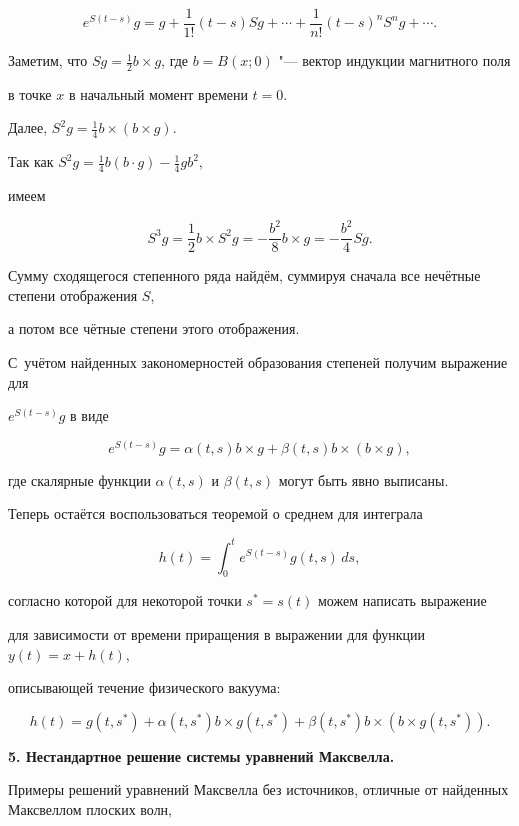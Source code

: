$$

e^{S(t-s)}g = g + \frac{1}{1!}(t-s)Sg + \cdots + \frac{1}{n!}(t-s)^nS^ng + \cdots.

$$ 

Заметим, что $Sg = \frac{1}{2}b\times g$, где $b = B(x;0)$ "--- вектор индукции магнитного поля 

в точке $x$ в начальный момент времени $t = 0$. 



Далее, $S^2g = \frac{1}{4}b\times(b\times g)$. 

Так как $S^2g = \frac{1}{4}b(b\cdot g) - \frac{1}{4}gb^2 $, 

имеем

$$

S^3g = \frac{1}{2}b\times S^2g = -\frac{b^2}{8}b\times g = -\frac{b^2}{4}Sg. 

$$

Сумму сходящегося степенного ряда найдём, суммируя сначала все нечётные степени отображения $S$, 

а потом все чётные степени этого отображения. 

С~учётом найденных закономерностей образования степеней получим выражение для 

$e^{S(t-s)}g$ в виде 

$$e^{S(t-s)}g = \alpha(t,s)b\times g + \beta(t,s)b\times(b\times g),$$ 

где скалярные функции $\alpha(t,s)$ и $\beta(t,s)$ могут быть явно выписаны. 



Теперь остаётся воспользоваться теоремой о среднем для интеграла 

$$h(t) = \int_0^te^{S(t-s)}g(t,s)\,ds ,$$ 

согласно которой для некоторой точки $s^* = s(t)$ можем написать выражение 

для зависимости от времени приращения в выражении для функции $y(t) = x + h(t)$, 

описывающей течение физического вакуума: 

$$

h(t) = g(t,s^*) + \alpha(t,s^*)b\times g(t,s^*) + \beta(t,s^*)b\times(b\times g(t,s^*)).

$$

 

\smallskip 

 

{\bf 5. Нестандартное решение системы уравнений Максвелла.} 

Примеры решений уравнений Максвелла без источников, отличные от найденных Максвеллом плоских волн,

